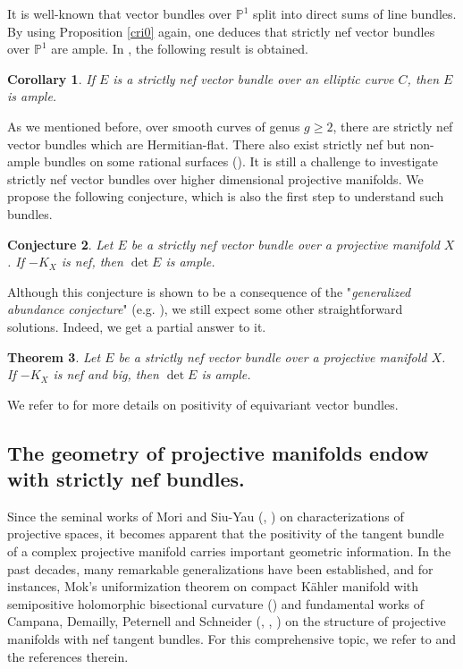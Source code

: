 \documentclass[english,reqno]{amsart}
\newcommand\bbP{{\mathbb P}}
\theoremstyle{plain}
\newtheorem{thm}{Theorem}[section]
\newtheorem{cor}[thm]{Corollary}
\newtheorem{conj}[thm]{Conjecture}
\theoremstyle{definition}
\numberwithin{equation}{section} %
\begin{document}
 It is well-known that vector bundles over $\bbP^1$ split into direct sums of line bundles. By using Proposition \ref{cri0} again, one deduces that strictly nef vector bundles over $\bbP^1$ are  ample. In \cite[Theorem~3.1]{LiOuYang2019}, the following result is obtained.
 \begin{cor} If $E$ is a strictly nef vector bundle over an elliptic curve $C$, then $E$ is ample.
 \end{cor}
 \noindent  As we mentioned before, over smooth curves of genus $g\geq 2$,  there are strictly nef vector bundles  which are Hermitian-flat.  There also exist strictly nef but non-ample  bundles on some rational surfaces (\cite{LanteriRondena1994, Chaudhuri2020}).  It is still a challenge to investigate  strictly nef vector bundles over higher dimensional projective manifolds.
 We propose the following conjecture, which is also the first step to understand such bundles.

 \begin{conj}\label{LOYconjecture1} Let $E$ be a strictly nef vector bundle over a projective manifold $X$.   If $-K_X$ is nef, then $\det E$ is ample.
 \end{conj}

 \noindent Although this conjecture is shown to be a consequence of the "\emph{generalized abundance conjecture}" (e.g. \cite{LazicPeternell2020,LazicPeternell2020a}), we still expect some other straightforward solutions. Indeed, we get  a partial answer to it.

 \begin{thm} Let $E$ be a strictly nef vector bundle over a projective manifold $X$.   If $-K_X$ is nef and big, then $\det E$ is ample.
 \end{thm}
\noindent  We  refer to \cite{Hering2010,Biswas2019} for more details on positivity of equivariant vector bundles.



\subsection{The geometry of projective manifolds endow with strictly nef bundles.} Since the seminal works of Mori   and Siu-Yau
(\cite{Mori1979}, \cite{SiuYau1980}) on characterizations of projective spaces, it becomes apparent that the
positivity
of the tangent bundle of a complex projective manifold
carries important geometric information. In the past
decades,  many remarkable generalizations  have been
established, and for instances, Mok's uniformization theorem on compact K\"ahler manifold
with semipositive holomorphic bisectional curvature (\cite{Mok1988}) and  fundamental works of Campana,
Demailly, Peternell and Schneider (\cite{CampanaPeternell1991},
\cite{DemaillyPeternellSchneider1994}, \cite{Peternell1996})  on the
structure of projective manifolds with nef tangent bundles. For this comprehensive topic, we refer to \cite{Yau1974,Mori1979, SiuYau1980,Mok1988,CampanaPeternell1991,DemaillyPeternellSchneider1994,Peternell1996,DemaillyPeternellSchneider2001,MunozOcchettaSolaCondeWatanabeEtAl2015,Cao2016,LiOuYang2019,CaoHoering2019,CaoHoering2019,CampanaCaoPaun2019} and the references therein. \\
\end{document}
